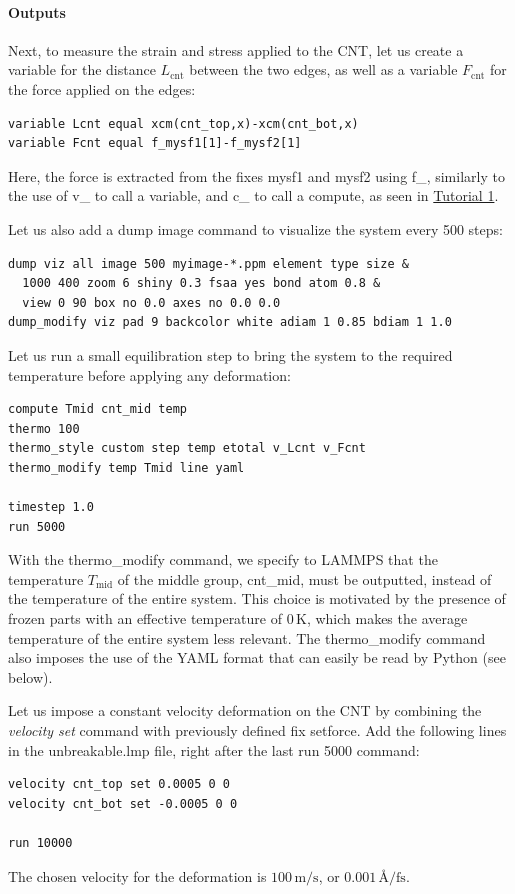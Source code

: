\documentclass[9pt,tutorial]{livecoms}
\newcommand{\lmpcmd}[1]{\hspace{0pt}\colorbox{listing}{\textcolor{command}{\small{#1}}}\hspace{0pt}} %
\begin{document}
\paragraph{Outputs}
Next, to measure the strain and stress applied to the CNT, let us create a
variable for the distance $L_\text{cnt}$ between the two edges,
as well as a variable $F_\text{cnt}$ for the force applied on the edges:
\begin{lstlisting}
variable Lcnt equal xcm(cnt_top,x)-xcm(cnt_bot,x)
variable Fcnt equal f_mysf1[1]-f_mysf2[1]
\end{lstlisting}
Here, the force is extracted from the fixes \lmpcmd{mysf1} and \lmpcmd{mysf2}
using \lmpcmd{f\_}, similarly to the use of \lmpcmd{v\_} to call a variable,
and \lmpcmd{c\_} to call a compute, as seen in \hyperref[lennard-jones-label]{Tutorial 1}.

Let us also add a \lmpcmd{dump image} command to visualize the system
every 500 steps:
\begin{lstlisting}
dump viz all image 500 myimage-*.ppm element type size &
  1000 400 zoom 6 shiny 0.3 fsaa yes bond atom 0.8 &
  view 0 90 box no 0.0 axes no 0.0 0.0
dump_modify viz pad 9 backcolor white adiam 1 0.85 bdiam 1 1.0
\end{lstlisting}
Let us run a small equilibration step to bring the system to the required
temperature before applying any deformation:
\begin{lstlisting}
compute Tmid cnt_mid temp
thermo 100
thermo_style custom step temp etotal v_Lcnt v_Fcnt
thermo_modify temp Tmid line yaml

timestep 1.0
run 5000
\end{lstlisting}
With the \lmpcmd{thermo\_modify} command, we specify to LAMMPS that the
temperature $T_\mathrm{mid}$ of the middle group, \lmpcmd{cnt\_mid},
must be outputted, instead of the temperature of the entire system.
This choice is motivated by the presence of
frozen parts with an effective temperature of 0\,K, which makes the average
temperature of the entire system less relevant.  The \lmpcmd{thermo\_modify}
command also imposes the use of the YAML format that can easily be read by
Python (see below).

Let us impose a constant velocity deformation on the CNT
by combining the \textit{velocity set} command with previously defined
\lmpcmd{fix setforce}.  Add the following lines in the \lmpcmd{unbreakable.lmp}
file, right after the last \lmpcmd{run 5000} command:
\begin{lstlisting}
velocity cnt_top set 0.0005 0 0
velocity cnt_bot set -0.0005 0 0

run 10000
\end{lstlisting}
The chosen velocity for the deformation is $100\,\text{m/s}$, or
$0.001\,\text{\AA{}/fs}$.
\end{document}
